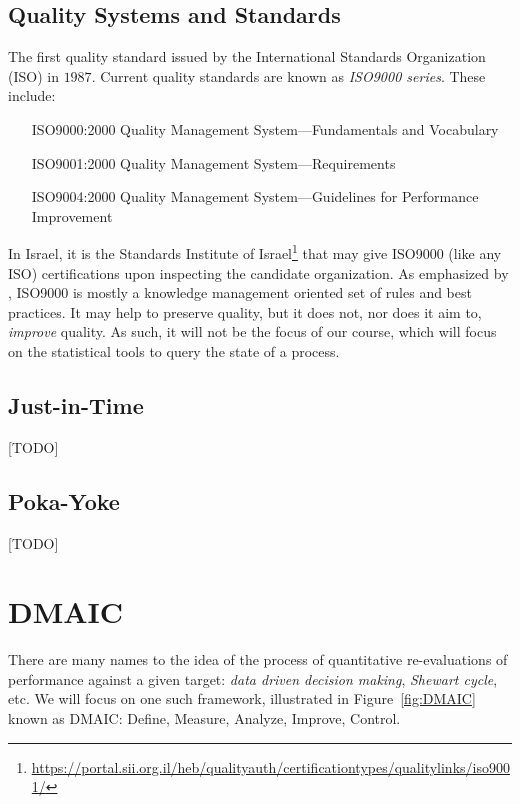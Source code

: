 \documentclass[12pt,a4paper]{report}
\begin{document}
\subsection{Quality Systems and Standards}
The first quality standard issued by the International Standards Organization (ISO) in $1987$.
Current quality standards are known as \emph{ISO9000 series}. These include:
\begin{enumerate}
\item [ISO9000:2000] Quality Management System—Fundamentals and Vocabulary
\item [ISO9001:2000] Quality Management System—Requirements
\item [ISO9004:2000] Quality Management System—Guidelines for Performance Improvement
\end{enumerate}
In Israel, it is the Standards Institute of Israel\footnote{\url{https://portal.sii.org.il/heb/qualityauth/certificationtypes/qualitylinks/iso9001/}} that may give ISO9000 (like any ISO) certifications upon inspecting the candidate organization.
As emphasized by \citet[p.24]{montgomery_introduction_2007}, ISO9000 is mostly a knowledge management oriented set of rules and best practices. 
It may help to preserve quality, but it does not, nor does it aim to, \emph{improve} quality.
As such, it will not be the focus of our course, which will focus on the statistical tools to query the state of a process.



\subsection{Just-in-Time}
[TODO]


\subsection{Poka-Yoke}
[TODO]




\section{DMAIC}
There are many names to the idea of the process of quantitative re-evaluations of performance against a given target: \emph{data driven decision making}, \emph{Shewart cycle}, etc.
We will focus on one such framework, illustrated in Figure~\ref{fig:DMAIC} known as DMAIC: Define, Measure, Analyze, Improve, Control.
\end{document}
